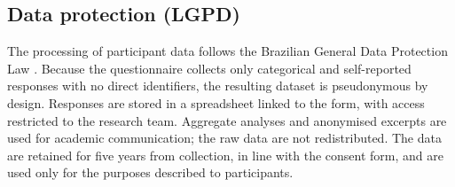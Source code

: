 \subsection{Data protection (LGPD)}

The processing of participant data follows the Brazilian General Data Protection Law \cite{lgpd2018}. Because the questionnaire collects only categorical and self-reported responses with no direct identifiers, the resulting dataset is pseudonymous by design. Responses are stored in a spreadsheet linked to the form, with access restricted to the research team. Aggregate analyses and anonymised excerpts are used for academic communication; the raw data are not redistributed. The data are retained for five years from collection, in line with the consent form, and are used only for the purposes described to participants.
